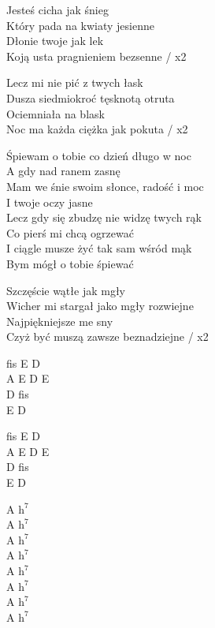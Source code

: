 \begin{text}
    Jesteś cicha jak śnieg\\
    Który pada na kwiaty jesienne\\
    Dłonie twoje jak lek\\
    Koją usta pragnieniem bezsenne / x2

    Lecz mi nie pić z twych łask\\
    Dusza siedmiokroć tęsknotą otruta\\
    Ociemniała na blask\\
    Noc ma każda ciężka jak pokuta / x2

    Śpiewam o tobie co dzień długo w noc\\
    A gdy nad ranem zasnę\\
    Mam we śnie swoim słonce, radość i moc\\
    I twoje oczy jasne\\
    Lecz gdy się zbudzę nie widzę twych rąk\\
    Co pierś mi chcą ogrzewać\\
    I ciągle musze żyć tak sam wśród mąk\\
    Bym mógł o tobie śpiewać

    Szczęście wątłe jak mgły\\
    Wicher mi stargał jako mgły rozwiejne\\
    Najpiękniejsze me sny\\
    Czyż być muszą zawsze beznadziejne / x2
\end{text}
\begin{chord}
    fis E D\\
    A E D E\\
    D fis\\
    E D

    fis E D\\
    A E D E\\
    D fis\\
    E D

    A $\mathrm{h^{7}}$\\
    A $\mathrm{h^{7}}$\\
    A $\mathrm{h^{7}}$\\
    A $\mathrm{h^{7}}$\\
    A $\mathrm{h^{7}}$\\
    A $\mathrm{h^{7}}$\\
    A $\mathrm{h^{7}}$\\
    A $\mathrm{h^{7}}$
\end{chord}
